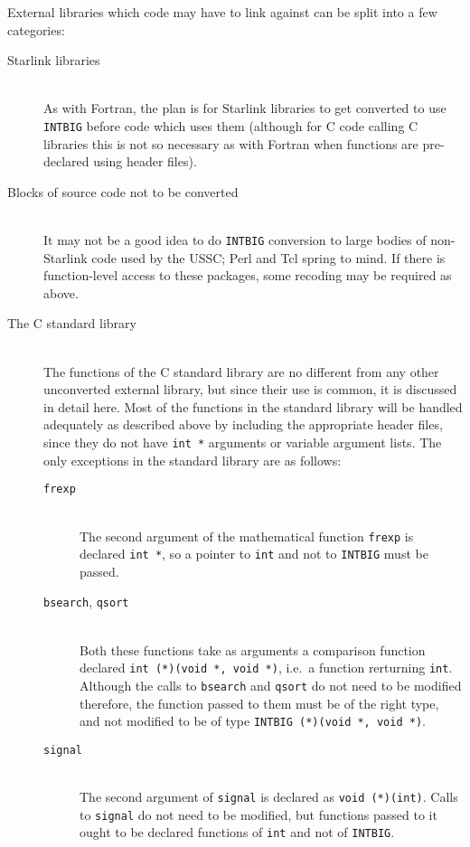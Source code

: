 \documentclass[twoside,11pt]{article}
\newcommand{\html}[1]{}
\renewcommand{\_}{\texttt{\symbol{95}}}
\newcommand{\cc}[1]{{\tt #1}}
\newcommand{\ditem}[1]{\item[#1]\mbox{}\\}
\newenvironment{squote}{\begin{quote}\begin{small}}{\end{small}\end{quote}}
\begin{document}
External libraries which code may have to link against
can be split into a few categories:
\begin{description}
%
\ditem{Starlink libraries}
As with Fortran, the plan is for Starlink libraries to get converted
to use \cc{INT\_BIG}
before code which uses them (although for C code calling C libraries
this is not so necessary as with Fortran when functions are pre-declared
using header files).
\html{\begin{squote}\end{squote}}
%
\ditem{Blocks of source code not to be converted}
It may not be a good idea to do \cc{INT\_BIG} conversion to
large bodies of non-Starlink code used by the USSC; Perl and Tcl
spring to mind.  
If there is function-level access to these packages,
some recoding may be required as above.
\html{\begin{squote}\end{squote}}
%
\ditem{The C standard library}
The functions of the C standard library are no different from any
other unconverted external library, but since their use is
common, it is discussed in detail here.
Most of the functions in the standard library will be handled
adequately as described above by including the appropriate header files,
since they do not have \cc{int~*} arguments or variable argument lists.
The only exceptions in the standard library are as follows:
\begin{description}
%
\ditem{\cc{frexp}}
The second argument of the mathematical function \cc{frexp} is declared
\cc{int *}, so a pointer to \cc{int} and not to \cc{INT\_BIG} must be passed.
\html{\begin{squote}\end{squote}}
%
\ditem{\cc{bsearch}, \cc{qsort}}
Both these functions take as arguments a comparison function 
declared \cc{int (*)(void *, void *)},
i.e.\ a function rerturning \cc{int}.
Although the calls to \cc{bsearch} and \cc{qsort} do not need to be
modified therefore, the function passed to them must be of the right
type, and not modified to be of type \cc{INT\_BIG (*)(void *, void *)}.
\html{\begin{squote}\end{squote}}
%
\ditem{\cc{signal}}
The second argument of \cc{signal} is declared as \cc{void (*)(int)}.
Calls to \cc{signal} do not need to be modified, but functions 
passed to it ought to be declared 
functions of \cc{int} and not of \cc{INT\_BIG}.
\html{\begin{squote}\end{squote}}

\end{description}
\end{description}
\end{document}
